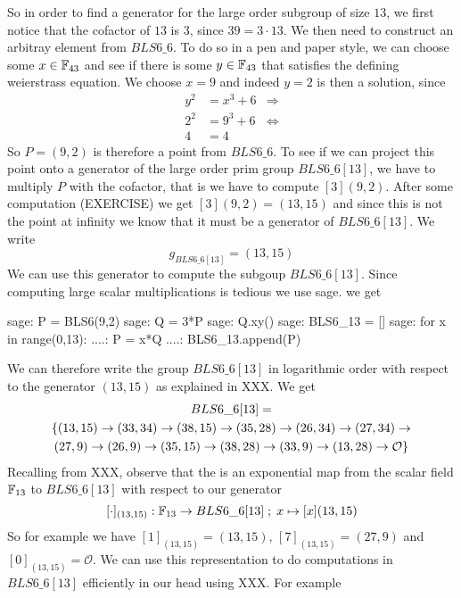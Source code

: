 So in order to find a generator for the large order subgroup of size $13$, we first notice that the cofactor of $13$ is $3$, since $39=3\cdot 13$. We then need to construct an arbitray element from $BLS6\_6$. To do so in a pen and paper style, we can choose some $x\in\mathbb{F}_{43}$ and see if there is some $y\in\mathbb{F}_{43}$ that satisfies the defining weierstrass equation. We choose $x=9$ and indeed $y=2$ is then a solution, since
\begin{align*}
y^2 & = x^3 + 6 & \Rightarrow \\
2^2 & = 9^3 + 6 & \Leftrightarrow \\
4 & = 4
\end{align*}   
So $P=(9,2)$ is therefore a point from $BLS6\_6$. To see if we can project this point onto a generator of the large order prim group $BLS6\_6[13]$, we have to multiply $P$ with the cofactor, that is we have to compute $[3](9,2)$. After some computation (EXERCISE) we get $[3](9,2) = (13,15)$ and since this is not the point at infinity we know that it must be a generator of $BLS6\_6[13]$. We write
\begin{equation}
g_{BLS6\_6[13]} = (13,15)
\end{equation}
We can use this generator to compute the subgoup $BLS6\_6[13]$. Since computing large scalar multiplications is tedious we use sage. we get
\begin{sagecommandline}
sage: P = BLS6(9,2)
sage: Q = 3*P
sage: Q.xy()
sage: BLS6_13 = []
sage: for x in range(0,13):
....:     P = x*Q
....:     BLS6_13.append(P)
\end{sagecommandline}
We can therefore write the group $BLS6\_6[13]$ in logarithmic order with respect to the generator $(13,15)$ as explained in XXX. We get
\begin{multline}
BLS6\_6[13]=\\
\{(13,15) \rightarrow (33,34) \rightarrow  (38,15) \rightarrow  (35,28) \rightarrow (26,34) \rightarrow  (27,34) \rightarrow  \\ 
(27,9)  \rightarrow  (26,9) \rightarrow  (35,15) \rightarrow  (38,28) \rightarrow  (33,9) \rightarrow (13,28) \rightarrow  \mathcal{O}\}$$
\end{multline}
Recalling from XXX, observe that the is an exponential map from the scalar field $\mathbb{F}_{13}$ to $BLS6\_6[13]$ with respect to our generator
$$
[\cdot]_{(13,15)}: \mathbb{F}_{13} \to BLS6\_6[13]\;;\; x \mapsto [x](13,15)
$$
So for example we have $[1]_{(13,15)}= (13,15)$, $[7]_{(13,15)}= (27,9)$ and $[0]_{(13,15)}= \mathcal{O}$. We can use this representation to do computations in $BLS6\_6[13]$ efficiently in our head using XXX. For example 
